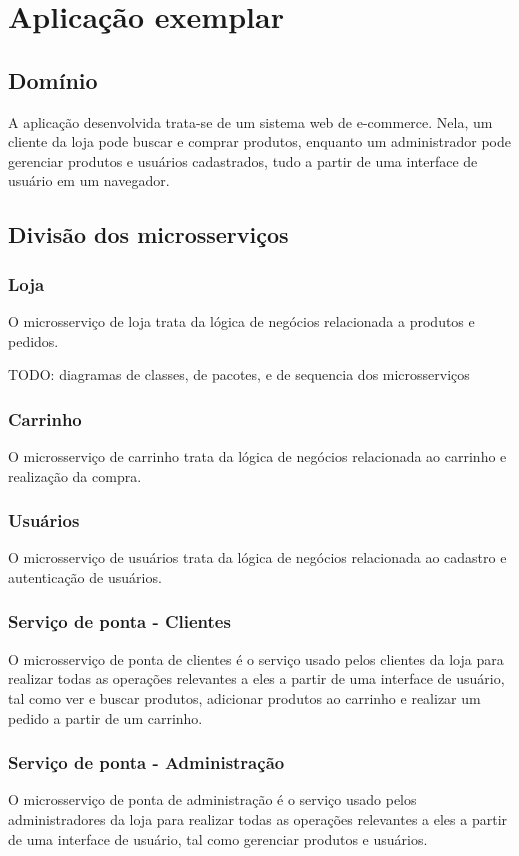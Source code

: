 \chapter{Aplicação exemplar}\label{chapter-aplicacao}


\section{Domínio}
A aplicação desenvolvida trata-se de um sistema web de e-commerce. Nela, um cliente da loja pode buscar e comprar produtos, enquanto um administrador pode gerenciar produtos e usuários cadastrados, tudo a partir de uma interface de usuário em um navegador.

\section{Divisão dos microsserviços}

\subsection{Loja}
O microsserviço de loja trata da lógica de negócios relacionada a produtos e pedidos.

TODO: diagramas de classes, de pacotes, e de sequencia dos microsserviços

\subsection{Carrinho}
O microsserviço de carrinho trata da lógica de negócios relacionada ao carrinho e realização da compra.

\subsection{Usuários}
O microsserviço de usuários trata da lógica de negócios relacionada ao cadastro e autenticação de usuários.

\subsection{Serviço de ponta - Clientes}
O microsserviço de ponta de clientes é o serviço usado pelos clientes da loja para realizar todas as operações relevantes a eles a partir de uma interface de usuário, tal como ver e buscar produtos, adicionar produtos ao carrinho e realizar um pedido a partir de um carrinho.

\subsection{Serviço de ponta - Administração}
O microsserviço de ponta de administração é o serviço usado pelos administradores da loja para realizar todas as operações relevantes a eles a partir de uma interface de usuário, tal como gerenciar produtos e usuários.
